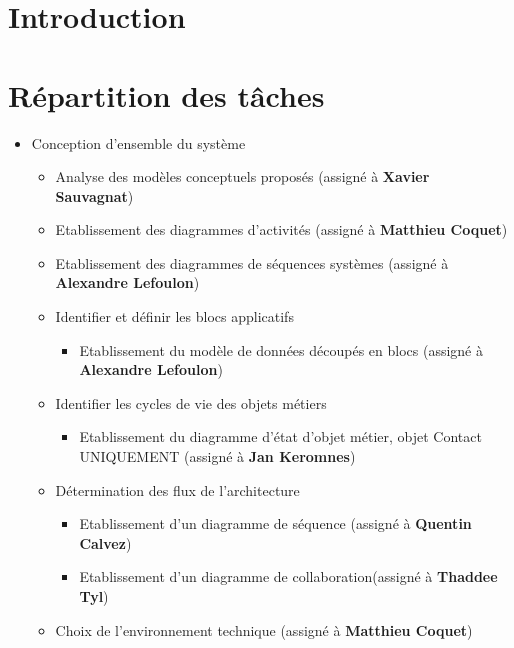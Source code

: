 

\section{Introduction}

\section{Répartition des tâches}

\begin{itemize}
\item Conception d'ensemble du système

\begin{itemize}
\item Analyse des modèles conceptuels proposés (assigné à \textbf{Xavier Sauvagnat})
\item Etablissement des diagrammes d'activités (assigné à \textbf{Matthieu Coquet})
\item Etablissement des diagrammes de séquences systèmes (assigné à \textbf{Alexandre Lefoulon})
\item Identifier et définir les blocs applicatifs

\begin{itemize}
\item Etablissement du modèle de données découpés en blocs (assigné à \textbf{Alexandre Lefoulon})
\end{itemize}

\item Identifier les cycles de vie des objets métiers

\begin{itemize}
\item Etablissement du diagramme d'état d'objet métier, objet Contact UNIQUEMENT (assigné à \textbf{Jan Keromnes})
\end{itemize}

\item Détermination des flux de l'architecture

\begin{itemize}
\item Etablissement d'un diagramme de séquence (assigné à \textbf{Quentin Calvez})
\item Etablissement d'un diagramme de collaboration(assigné à \textbf{Thaddee Tyl})
\end{itemize}

\item Choix de l'environnement technique (assigné à \textbf{Matthieu Coquet})


\end{itemize}
\end{itemize}
